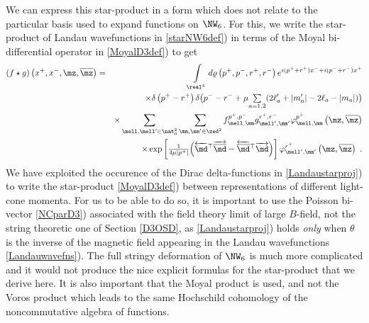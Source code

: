 We can express this star-product in a form which does not relate to
the particular basis used to expand functions on $\NW_6$. For this, we
write the star-product of Landau wavefunctions in \eqref{starNW6def})
in terms of the Moyal bi-differential operator in \eqref{MoyalD3def})
to get
\begin{eqnarray}
(f\star g)\left(x^+,x^-,\mz,\overline{\mz} \right)&=&
\int\limits_{\real^4} d\varrho\left(p^+,p^-,r^+,r^-\right) 
 e^{ i(p^++r^+)x^-+ i(p^-+r^-)x^+}
\nonumber\\ &&\times \delta\left(p^+-r^+\right) \delta\bigl(p^--r^-+\mu 
\mbox{$\sum\limits_{a=1,2}$}(2\ell_a'+|m_a'|-2\ell_a-|m_a|)\bigr)
\nonumber\\ &&\times \sum_{\mell,\mell'\in\nat_0^2} 
\sum_{\mm,\mm'\in\zed^2}f_{\mell,\mm}^{p^+,p^-} 
g_{\mell',\mm'}^{r^+,r^-} \varphi_{\mell,\mm}^{p^+}
\left(\mz,\overline{\mz} \right)\nonumber\\ &&
\times \exp\left[\mbox{$\frac1{4\mu 
\left|p^+\right|}$} \Bigl(\overleftarrow{\md}{}^{ \top} 
\overrightarrow{\overline{\md}}
-\overleftarrow{\overline{\md}}{}^{ \top} 
\overrightarrow{\md} \Bigr)\right] 
\varphi_{\mell',\mm'}^{r^+}\left(\mz,\overline{\mz} \right) \ .
\label{starNW6bidiff}\end{eqnarray}
We have exploited the occurence of the Dirac delta-functions in
\eqref{Landaustarproj}) to write the star-product \eqref{MoyalD3def})
between representations of different light-cone momenta. For us to be
able to do so, it is important to use the Poisson bi-vector
\eqref{NCparD3}) associated with the field theory limit of large
$B$-field, not the string theoretic one of Section \ref{D3OSD}, as
\eqref{Landaustarproj}) holds {\it only} when $\theta$ is the inverse
of the magnetic field appearing in the Landau wavefunctions
\eqref{Landauwavefns}). The full stringy deformation of $\NW_6$
is much more complicated and it would not produce the nice explicit
formulas for the star-product that we derive here. It is also
important that the Moyal product is used, and not the Voros
product which leads to the same Hochschild cohomology of the
noncommutative algebra of functions.

